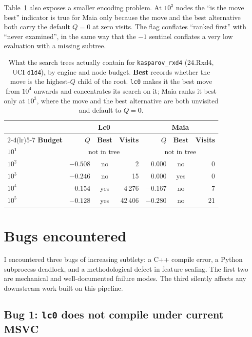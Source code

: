 \documentclass[11pt,a4paper]{article}
\begin{document}
Table~\ref{tab:kasparov} also exposes a smaller encoding problem. At
$10^3$ nodes the ``is the move best'' indicator is true for Maia only
because the move and the best alternative both carry the default
$Q = 0$ at zero visits. The flag conflates ``ranked first'' with
``never examined'', in the same way that the $-1$ sentinel conflates a
very low evaluation with a missing subtree.

\begin{table}[h]
\centering\small
\caption{What the search trees actually contain for
  \texttt{kasparov\_rxd4} (24.Rxd4, UCI \texttt{d1d4}), by engine and
  node budget. \textbf{Best} records whether the move is the
  highest-$Q$ child of the root. \texttt{lc0} makes it the best move
  from $10^4$ onwards and concentrates its search on it; Maia ranks it
  best only at $10^3$, where the move and the best alternative are both
  unvisited and default to $Q = 0$.}
\label{tab:kasparov}
\begin{tabular}{@{}lrcrrcr@{}}
\toprule
& \multicolumn{3}{c}{\textbf{Lc0}} & \multicolumn{3}{c}{\textbf{Maia}} \\
\cmidrule(lr){2-4}\cmidrule(lr){5-7}
\textbf{Budget} & $Q$ & \textbf{Best} & \textbf{Visits}
                & $Q$ & \textbf{Best} & \textbf{Visits} \\
\midrule
$10^1$ & \multicolumn{3}{c}{not in tree} & \multicolumn{3}{c}{not in tree} \\
$10^2$ & $-0.508$ & no  & 2       & $0.000$  & no  & 0  \\
$10^3$ & $-0.246$ & no  & 15      & $0.000$  & yes & 0  \\
$10^4$ & $-0.154$ & yes & 4\,276  & $-0.167$ & no  & 7  \\
$10^5$ & $-0.128$ & yes & 42\,406 & $-0.280$ & no  & 21 \\
\bottomrule
\end{tabular}
\end{table}

\section{Bugs encountered}
\label{sec:bugs}

I encountered three bugs of increasing subtlety: a C++ compile error,
a Python subprocess deadlock, and a methodological defect in feature
scaling. The first two are mechanical and well-documented failure
modes. The third silently affects any downstream work built on this
pipeline.

\subsection{Bug 1: \texttt{lc0} does not compile under current MSVC}
\label{sec:bug1}
\end{document}
